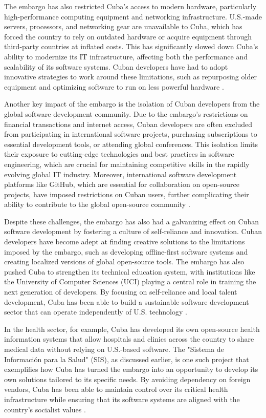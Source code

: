 \begin{refsection}
The embargo has also restricted Cuba’s access to modern hardware, particularly high-performance computing equipment and networking infrastructure. U.S.-made servers, processors, and networking gear are unavailable to Cuba, which has forced the country to rely on outdated hardware or acquire equipment through third-party countries at inflated costs. This has significantly slowed down Cuba’s ability to modernize its IT infrastructure, affecting both the performance and scalability of its software systems. Cuban developers have had to adopt innovative strategies to work around these limitations, such as repurposing older equipment and optimizing software to run on less powerful hardware \cite[pp.~112-134]{perez}.

Another key impact of the embargo is the isolation of Cuban developers from the global software development community. Due to the embargo’s restrictions on financial transactions and internet access, Cuban developers are often excluded from participating in international software projects, purchasing subscriptions to essential development tools, or attending global conferences. This isolation limits their exposure to cutting-edge technologies and best practices in software engineering, which are crucial for maintaining competitive skills in the rapidly evolving global IT industry. Moreover, international software development platforms like GitHub, which are essential for collaboration on open-source projects, have imposed restrictions on Cuban users, further complicating their ability to contribute to the global open-source community \cite[pp.~78-98]{kapcia}.

Despite these challenges, the embargo has also had a galvanizing effect on Cuban software development by fostering a culture of self-reliance and innovation. Cuban developers have become adept at finding creative solutions to the limitations imposed by the embargo, such as developing offline-first software systems and creating localized versions of global open-source tools. The embargo has also pushed Cuba to strengthen its technical education system, with institutions like the University of Computer Sciences (UCI) playing a central role in training the next generation of developers. By focusing on self-reliance and local talent development, Cuba has been able to build a sustainable software development sector that can operate independently of U.S. technology \cite[pp.~67-89]{feinberg}.

In the health sector, for example, Cuba has developed its own open-source health information systems that allow hospitals and clinics across the country to share medical data without relying on U.S.-based software. The "Sistema de Información para la Salud" (SIS), as discussed earlier, is one such project that exemplifies how Cuba has turned the embargo into an opportunity to develop its own solutions tailored to its specific needs. By avoiding dependency on foreign vendors, Cuba has been able to maintain control over its critical health infrastructure while ensuring that its software systems are aligned with the country’s socialist values \cite[pp.~90-110]{kapcia}.


\end{refsection}
